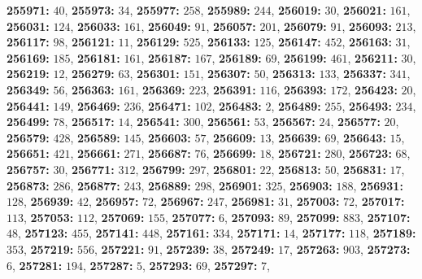 \textsf{\bfseries 255971:} $40$, \textsf{\bfseries 255973:} $34$, \textsf{\bfseries 255977:} $258$, \textsf{\bfseries 255989:} $244$, \textsf{\bfseries 256019:} $30$, \textsf{\bfseries 256021:} $161$, \textsf{\bfseries 256031:} $124$, \textsf{\bfseries 256033:} $161$, \textsf{\bfseries 256049:} $91$, \textsf{\bfseries 256057:} $201$, \textsf{\bfseries 256079:} $91$, \textsf{\bfseries 256093:} $213$, \textsf{\bfseries 256117:} $98$, \textsf{\bfseries 256121:} $11$, \textsf{\bfseries 256129:} $525$, \textsf{\bfseries 256133:} $125$, \textsf{\bfseries 256147:} $452$, \textsf{\bfseries 256163:} $31$, \textsf{\bfseries 256169:} $185$, \textsf{\bfseries 256181:} $161$, \textsf{\bfseries 256187:} $167$, \textsf{\bfseries 256189:} $69$, \textsf{\bfseries 256199:} $461$, \textsf{\bfseries 256211:} $30$, \textsf{\bfseries 256219:} $12$, \textsf{\bfseries 256279:} $63$, \textsf{\bfseries 256301:} $151$, \textsf{\bfseries 256307:} $50$, \textsf{\bfseries 256313:} $133$, \textsf{\bfseries 256337:} $341$, \textsf{\bfseries 256349:} $56$, \textsf{\bfseries 256363:} $161$, \textsf{\bfseries 256369:} $223$, \textsf{\bfseries 256391:} $116$, \textsf{\bfseries 256393:} $172$, \textsf{\bfseries 256423:} $20$, \textsf{\bfseries 256441:} $149$, \textsf{\bfseries 256469:} $236$, \textsf{\bfseries 256471:} $102$, \textsf{\bfseries 256483:} $2$, \textsf{\bfseries 256489:} $255$, \textsf{\bfseries 256493:} $234$, \textsf{\bfseries 256499:} $78$, \textsf{\bfseries 256517:} $14$, \textsf{\bfseries 256541:} $300$, \textsf{\bfseries 256561:} $53$, \textsf{\bfseries 256567:} $24$, \textsf{\bfseries 256577:} $20$, \textsf{\bfseries 256579:} $428$, \textsf{\bfseries 256589:} $145$, \textsf{\bfseries 256603:} $57$, \textsf{\bfseries 256609:} $13$, \textsf{\bfseries 256639:} $69$, \textsf{\bfseries 256643:} $15$, \textsf{\bfseries 256651:} $421$, \textsf{\bfseries 256661:} $271$, \textsf{\bfseries 256687:} $76$, \textsf{\bfseries 256699:} $18$, \textsf{\bfseries 256721:} $280$, \textsf{\bfseries 256723:} $68$, \textsf{\bfseries 256757:} $30$, \textsf{\bfseries 256771:} $312$, \textsf{\bfseries 256799:} $297$, \textsf{\bfseries 256801:} $22$, \textsf{\bfseries 256813:} $50$, \textsf{\bfseries 256831:} $17$, \textsf{\bfseries 256873:} $286$, \textsf{\bfseries 256877:} $243$, \textsf{\bfseries 256889:} $298$, \textsf{\bfseries 256901:} $325$, \textsf{\bfseries 256903:} $188$, \textsf{\bfseries 256931:} $128$, \textsf{\bfseries 256939:} $42$, \textsf{\bfseries 256957:} $72$, \textsf{\bfseries 256967:} $247$, \textsf{\bfseries 256981:} $31$, \textsf{\bfseries 257003:} $72$, \textsf{\bfseries 257017:} $113$, \textsf{\bfseries 257053:} $112$, \textsf{\bfseries 257069:} $155$, \textsf{\bfseries 257077:} $6$, \textsf{\bfseries 257093:} $89$, \textsf{\bfseries 257099:} $883$, \textsf{\bfseries 257107:} $48$, \textsf{\bfseries 257123:} $455$, \textsf{\bfseries 257141:} $448$, \textsf{\bfseries 257161:} $334$, \textsf{\bfseries 257171:} $14$, \textsf{\bfseries 257177:} $118$, \textsf{\bfseries 257189:} $353$, \textsf{\bfseries 257219:} $556$, \textsf{\bfseries 257221:} $91$, \textsf{\bfseries 257239:} $38$, \textsf{\bfseries 257249:} $17$, \textsf{\bfseries 257263:} $903$, \textsf{\bfseries 257273:} $6$, \textsf{\bfseries 257281:} $194$, \textsf{\bfseries 257287:} $5$, \textsf{\bfseries 257293:} $69$, \textsf{\bfseries 257297:} $7$, 
